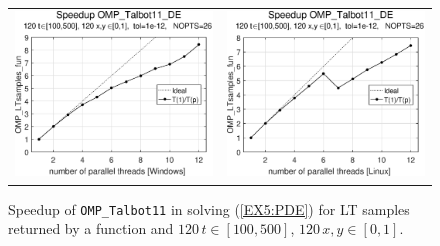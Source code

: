 \documentclass[a4paper,10pt]{report}%
\begin{document}
\begin{figure}[htb]
\centering
\begin{tabular}{cc} %
\includegraphics[height=0.2\textwidth]{./FIGS/EX5/EX5_fun_speedup_11_Windows.eps} &
\includegraphics[height=0.2\textwidth]{./FIGS/EX5/EX5_fun_speedup_11_Linux.eps}
\end{tabular}
\caption{\small Speedup of {\tt OMP\_Talbot11} in solving (\ref{EX5:PDE}) for LT samples returned by a
function and $120\,t\in[100,500]$, $120\,x,y\in[0,1]$.}
\label{PAR_EX5_speedup_fun}
\end{figure}


\end{document}

